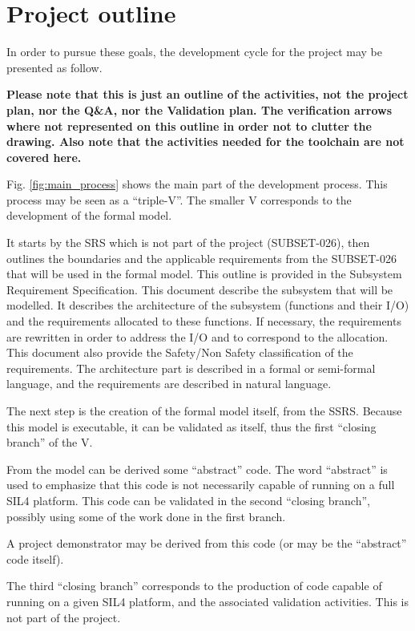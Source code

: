 \documentclass{template/openetcs_article}
\begin{document}
\section{Project outline}
In order to pursue these goals, the development cycle for the project may be presented as follow. 

\textbf{Please note that this is just an outline of the activities, not the project plan, nor the 
Q\&A, nor the Validation plan. The verification arrows where not represented on this outline in order 
not to clutter the drawing. Also note that the activities needed for the toolchain are not
covered here.}

Fig. \ref{fig:main_process} shows the main part of the development process. This process may be seen
as a ``triple-V''. The smaller V corresponds to the development of the formal model. 

It starts by the SRS which is not part of the project (SUBSET-026), then outlines the boundaries and 
the applicable requirements from the SUBSET-026 that will be used in the formal model. This outline 
is provided in the Subsystem Requirement Specification. This document describe the subsystem that 
will be modelled. It describes the architecture of the subsystem (functions and their I/O) and the 
requirements allocated to these functions. If necessary, the requirements are rewritten in order to 
address the I/O and to correspond to the allocation. This document also provide the Safety/Non Safety 
classification of the requirements. The architecture part is described in a formal or semi-formal 
language, and the requirements are described in natural language.

The next step is the creation of the formal model itself, from the SSRS. Because this model is executable, 
it can be validated as itself, thus the first ``closing branch'' of the V.

From the model can be derived some ``abstract'' code. The word ``abstract'' is used to emphasize that 
this code is not necessarily capable of running on a full SIL4 platform. This code can be validated 
in the second ``closing branch'', possibly using some of the work done in the first branch. 

A project demonstrator may be derived from this code (or may be the ``abstract'' code itself).

The third ``closing branch'' corresponds to the production of code capable of running on a 
given SIL4 platform, and the associated validation activities. This is not part of the project.
\end{document}
